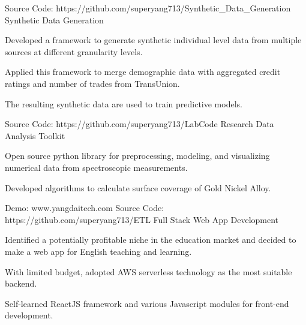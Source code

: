 


\begin{cventries}


\cventry
{Source Code: https://github.com/superyang713/Synthetic\_Data\_Generation}
{Synthetic Data Generation}
{}
{}
{
\begin{cvitems}
\item {Developed a framework to generate synthetic individual level data from
    multiple sources at different granularity levels.}
\item {Applied this framework to merge demographic data with aggregated credit
    ratings and number of trades from TransUnion.}
\item {The resulting synthetic data are used to train predictive models.}
\end{cvitems}
}


\cventry
{Source Code: https://github.com/superyang713/LabCode}
{Research Data Analysis Toolkit}
{}
{}
{
\begin{cvitems}
\item {Open source python library for preprocessing, modeling, and visualizing
    numerical data from spectroscopic measurements.}
\item {Developed algorithms to calculate surface coverage of Gold Nickel Alloy.}
\end{cvitems}
}


\cventry
{Demo: www.yangdaitech.com   Source Code: https://github.com/superyang713/ETL}
{Full Stack Web App Development}
{}
{}
{
\begin{cvitems}
\item {Identified a potentially profitable niche in the education market and
    decided to make a web app for English teaching and learning.}
\item {With limited budget, adopted AWS serverless technology as the most
    suitable backend.}
\item {Self-learned ReactJS framework and various Javascript modules for
    front-end development.}
\end{cvitems}
}


\end{cventries}


